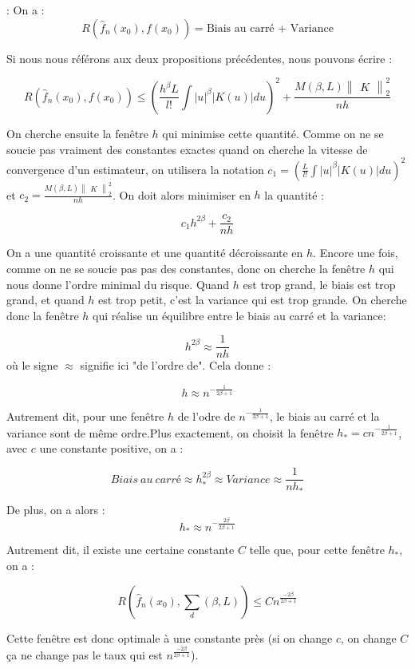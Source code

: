 \documentclass[
]{article}
\begin{document}
\begin{demonstration}: 
  On a :
$$
 R(\hat {f}_n(x_0),f(x_0))= \text{Biais au carré + Variance}
$$ 

   Si nous nous référons aux deux propositions précédentes, nous pouvons écrire :

$$
 R(\hat {f}_n(x_0),f(x_0))\leqslant(\frac{h^{\beta}L}{l!}\int |u|^{\beta}|K(u)|du)^2 + \frac{M(\beta,L)\begin{Vmatrix}K\end{Vmatrix}_2^2}{nh}
$$

On cherche ensuite la fenêtre $h$ qui minimise cette quantité. Comme on ne se soucie pas vraiment des constantes exactes quand on cherche la vitesse de convergence d'un estimateur, on utilisera la notation $c_1=(\frac{L}{l!}\int |u|^{\beta}|K(u)|du)^2$ et $c_2=\frac{M(\beta,L)\begin{Vmatrix}K\end{Vmatrix}_2^2}{nh}$. On doit alors minimiser en $h$ la quantité :


$$
  c_1h^{2\beta}+\frac{c_2}{nh}
$$

On a une quantité croissante et une quantité décroissante en $h$. Encore une fois, comme on ne se soucie pas pas des constantes, donc on cherche la fenêtre $h$ qui nous donne l'ordre minimal du risque. Quand $h$ est trop grand, le biais est trop grand, et quand $h$ est trop petit, c'est la variance qui est trop grande. On cherche donc la fenêtre $h$ qui réalise un équilibre entre le biais au carré et la variance:

$$ 
  h^{2\beta}\approx\frac{1}{nh}
$$
où le signe $\approx$ signifie ici "de l'ordre de". Cela donne :

$$
  h\approx n^{-\frac{1}{2\beta +1}}
$$

Autrement dit, pour une fenêtre $h$ de l'odre de $n^{-\frac{1}{2\beta+1}}$, le biais au carré et la variance sont de même ordre.Plus exactement, on choisit la fenêtre $h_*=cn^{-\frac{1}{2\beta+1}}$, avec $c$ une constante positive, on a :

$$
  Biais\ au\ carré \approx h_{*}^{2\beta}\approx Variance\approx \frac{1}{nh_{*}}
$$

De plus, on a alors :
$$
  h_* \approx n^{-\frac{2\beta}{2\beta + 1}}
$$

 
Autrement dit, il existe une certaine constante $C$ telle que, pour cette fenêtre $h_*$, on a :

$$
  R(\hat {f}_n(x_0),\sum_d(\beta,L))\leqslant Cn^{\frac{-2\beta}{2\beta + 1}}
$$

  Cette fenêtre est donc optimale à une constante près (si on change $c$, on change $C$ ça ne change pas le taux qui est $n^{\frac{-2\beta}{2\beta+1}}$).\newline
\end{demonstration}
\end{document}
